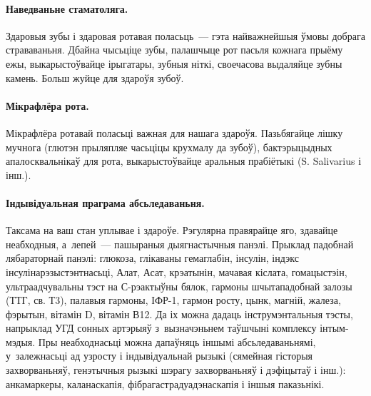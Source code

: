 
\paragraph{Наведваньне стаматоляга.}
Здаровыя зубы і здаровая ротавая поласьць~--- гэта найважнейшыя ўмовы добрага страваваньня. Дбайна чысьціце зубы, палашчыце рот пасьля кожнага прыёму ежы, выкарыстоўвайце ірыгатары, зубныя ніткі, своечасова выдаляйце зубны камень. Больш жуйце для здароўя зубоў.

\paragraph{Мікрафлёра рота.}
Мікрафлёра ротавай поласьці важная для нашага здароўя. Пазьбягайце лішку мучнога (глютэн прыляпляе часьціцы крухмалу да зубоў), бактэрыцыдных апалосквальнікаў для рота, выкарыстоўвайце аральныя прабіётыкі (S. Salivarius і інш.).

\paragraph{Індывідуальная праграма абсьледаваньня.}
Таксама на ваш стан уплывае і здароўе. Рэгулярна правярайце яго, здавайце неабходныя, а~лепей~--- пашыраныя дыягнастычныя панэлі. Прыклад падобнай лябараторнай панэлі: глюкоза, глікаваны гемаглабін, інсулін, індэкс інсулінарэзыстэнтнасьці, Алат, Асат, крэатынін, мачавая кіслата, гомацыстэін, ультраадчувальны тэст на С-рэактыўны бялок, гармоны шчытападобнай залозы (ТТГ, св. Т3), палавыя гармоны, ІФР-1, гармон росту, цынк, магній, жалеза, фэрытын, вітамін D, вітамін В12. Да іх можна дадаць інструмэнтальныя тэсты, напрыклад УГД сонных артэрыяў з~вызначэньнем таўшчыні комплексу інтым-мэдыя. Пры неабходнасьці можна дапаўняць іншымі абсьледаваньнямі, у~залежнасьці ад узросту і індывідуальнай рызыкі (сямейная гісторыя захворваньняў, генэтычныя рызыкі шэрагу захворваньняў і дэфіцытаў і інш.): анкамаркеры, каланаскапія, фібрагастрадуадэнаскапія і іншыя паказьнікі.
